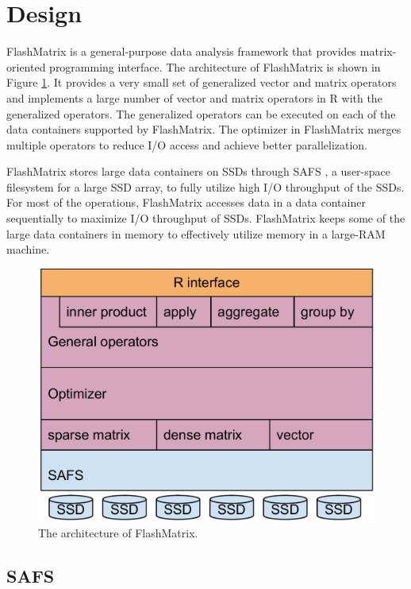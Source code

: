 \section{Design}

FlashMatrix is a general-purpose data analysis framework that provides
matrix-oriented programming interface. The architecture of FlashMatrix
is shown in Figure \ref{fig:arch}. It provides a very small set of
generalized vector and matrix operators and implements a large number of
vector and matrix operators in R with the generalized operators. The generalized
operators can be executed on each of the data containers supported by
FlashMatrix. The optimizer in FlashMatrix merges multiple operators to
reduce I/O access and achieve better parallelization.

FlashMatrix stores large data containers on SSDs through SAFS \cite{safs},
a user-space filesystem for a large SSD array, to fully utilize high I/O
throughput of the SSDs. For most of the operations, FlashMatrix accesses
data in a data container sequentially to maximize I/O throughput of SSDs.
FlashMatrix keeps some of the large data containers in memory to effectively
utilize memory in a large-RAM machine.

\begin{figure}
\centering
\includegraphics[scale=0.3]{./architecture.pdf}
\caption{The architecture of FlashMatrix.}
\label{fig:arch}
\end{figure}

\subsection{SAFS}


